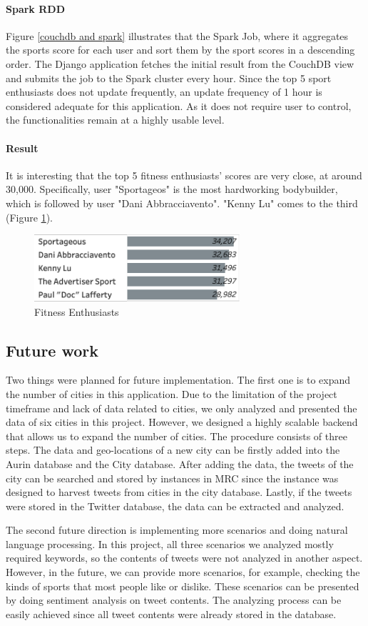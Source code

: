 \paragraph{Spark RDD}
Figure \ref{couchdb and spark} illustrates that the Spark Job, where it aggregates the sports score for each user and sort them by the sport scores in a descending order. The Django application fetches the initial result from the CouchDB view and submits the job to the Spark cluster every hour. Since the top 5 sport enthusiasts does not update frequently, an update frequency of 1 hour is considered adequate for this application. As it does not require user to control, the functionalities remain at a highly usable level. 

\paragraph{Result}
It is interesting that the top 5 fitness enthusiasts' scores are very close, at around 30,000. Specifically, user "Sportageos" is the most hardworking bodybuilder, which is followed by user "Dani Abbracciavento". "Kenny Lu" comes to the third (Figure \ref{enthusiasts}).

\begin{figure}[H]
\centerline{\includegraphics[width=3in]{Figures/enthusiasts.png}}
\caption{Fitness Enthusiasts \label{enthusiasts}}
\end{figure}

\subsection{Future work}
Two things were planned for future implementation.
The first one is to expand the number of cities in this application. Due to the limitation of the project timeframe and lack of data related to cities, we only analyzed and presented the data of six cities in this project. However, we designed a highly scalable backend that allows us to expand the number of cities. The procedure consists of three steps. The data and geo-locations of a new city can be firstly added into the Aurin database and the City database. After adding the data, the tweets of the city can be searched and stored by instances in MRC since the instance was designed to harvest tweets from cities in the city database. Lastly, if the tweets were stored in the Twitter database, the data can be extracted and analyzed.
 
The second future direction is implementing more scenarios and doing natural language processing. In this project, all three scenarios we analyzed mostly required keywords, so the contents of tweets were not analyzed in another aspect. However, in the future, we can provide more scenarios, for example, checking the kinds of sports that most people like or dislike. These scenarios can be presented by doing sentiment analysis on tweet contents. The analyzing process can be easily achieved since all tweet contents were already stored in the database.
